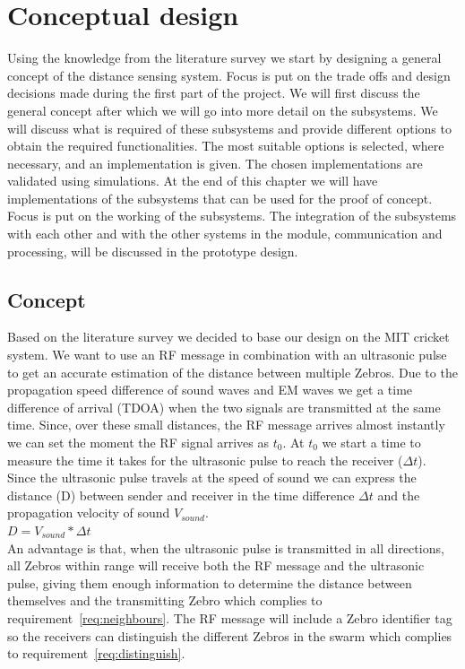 \chapter{Conceptual design}
\label{chap:concept}
Using the knowledge from the literature survey we start by designing a general concept of the distance sensing system. Focus is put on the trade offs and design decisions made during the first part of the project. We will first discuss the general concept after which we will go into more detail on the subsystems. We will discuss what is required of these subsystems and provide different options to obtain the required functionalities. The most suitable options is selected, where necessary, and an implementation is given. The chosen implementations are validated using simulations. At the end of this chapter we will have implementations of the subsystems that can be used for the proof of concept. Focus is put on the working of the subsystems. The integration of the subsystems with each other and with the other systems in the module, communication and processing, will be discussed in the prototype design.

\section{Concept}

Based on the literature survey we decided to base our design on the MIT cricket system. We want to use an RF message in combination with an ultrasonic pulse to get an accurate estimation of the distance between multiple Zebros. Due to the propagation speed difference of sound waves and EM waves we get a time difference of arrival (TDOA) when the two signals are transmitted at the same time. Since, over these small distances, the RF message arrives almost instantly we can set the moment the RF signal arrives as $t_{0}$. At $t_{0}$ we start a time to measure the time it takes for the ultrasonic pulse to reach the receiver ($\Delta t$). Since the ultrasonic pulse travels at the speed of sound we can express the distance (D) between sender and receiver in the time difference $\Delta t$ and the propagation velocity of sound $V_{sound}$.\\

$ D = V_{sound} * \Delta t $\\

An advantage is that, when the ultrasonic pulse is transmitted in all directions, all Zebros within range will receive both the RF message and the ultrasonic pulse, giving them enough information to determine the distance between themselves and the transmitting Zebro which complies to requirement~\ref{req:neighbours}.
The RF message will include a Zebro identifier tag so the receivers can distinguish the different Zebros in the swarm which complies to requirement~\ref{req:distinguish}.

